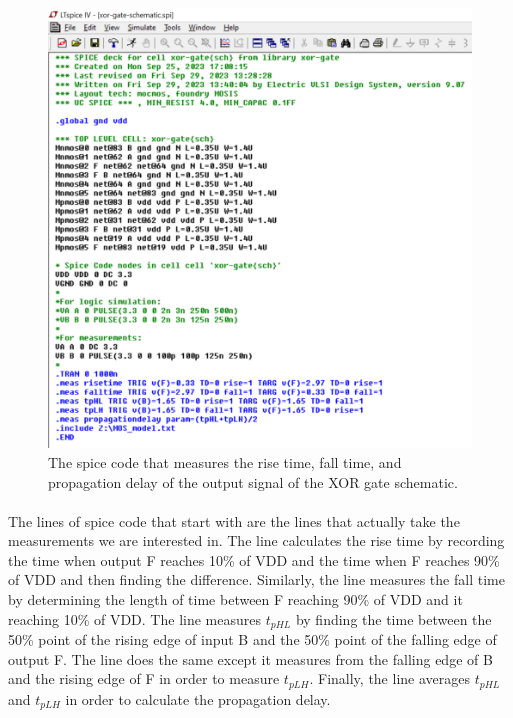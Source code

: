 \documentclass{article}
\begin{document}
  \begin{figure}[H]
    \centering
    \includegraphics[width=0.9\linewidth, frame]{screenshots/spice-meas-schematic.png}
    \caption{The spice code that measures the rise time, fall time, and propagation delay of the output signal of the XOR gate schematic.}
    \label{fig:sch-sim-meas}
  \end{figure}

  \paragraph{}
  The lines of spice code that start with  are the lines that actually take the measurements we are interested in. The line  calculates the rise time by recording the time when output F reaches 10\% of VDD and the time when F reaches 90\% of VDD and then finding the difference. Similarly, the line  measures the fall time by determining the length of time between F reaching 90\% of VDD and it reaching 10\% of VDD. The line  measures $t_{pHL}$ by finding the time between the 50\% point of the rising edge of input B and the 50\% point of the falling edge of output F. The line  does the same except it measures from the falling edge of B and the rising edge of F in order to measure $t_{pLH}$. Finally, the line  averages $t_{pHL}$ and $t_{pLH}$ in order to calculate the propagation delay.
\end{document}
